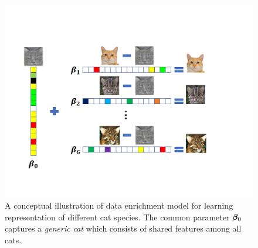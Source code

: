 %

\begin{figure}
		\centering
		\includegraphics[scale=.39]{./img/concept.pdf}
		\caption{A conceptual illustration of data enrichment model for learning representation of  different cat species. The common parameter $\boldsymbol{\beta}_0$ captures a \emph{generic cat} which consists of shared features among all cats.}
		\label{fig:cat}
\end{figure}



